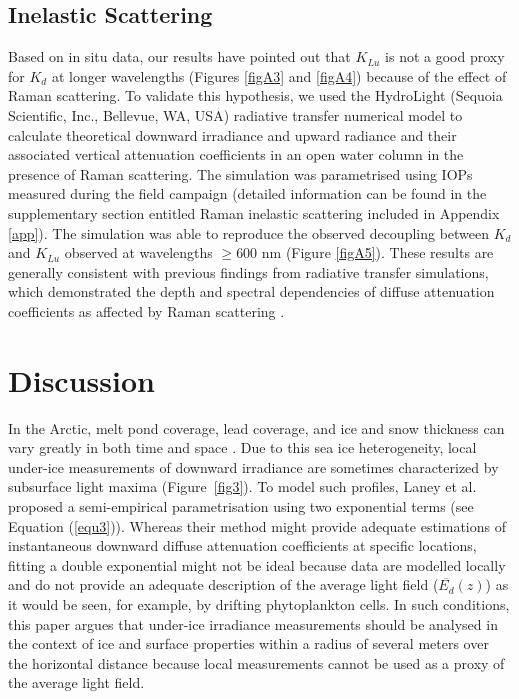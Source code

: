 \documentclass[applsci,article,accept,moreauthors,pdftex,10pt,a4paper]{Definitions/mdpi}
\newcommand{\ked}{\ensuremath{K_{d}}}
\newcommand{\klu}{\ensuremath{K_{Lu}}}
\newcommand{\meanedz}{\ensuremath{{\overline{E_d}(z)}}}
\begin{document}
\subsection{Inelastic Scattering}

Based on in situ data, our results have pointed out that \klu{} is not a good proxy for \ked{} at longer wavelengths (Figures \ref{figA3} and \ref{figA4}) because of the effect of Raman scattering. To validate this hypothesis, we used the HydroLight (Sequoia Scientific, Inc., Bellevue, WA, USA) 
radiative transfer numerical model to calculate theoretical downward irradiance and upward radiance and their associated vertical attenuation coefficients in an open water column in the presence of Raman scattering. The simulation was parametrised using IOPs measured during the field campaign (detailed information can be found in the supplementary section entitled Raman inelastic scattering included in Appendix \ref{app}). The simulation was able to reproduce the observed decoupling between \ked{} and \klu{} observed at wavelengths $\ge$600 nm (Figure  \ref{figA5}). These results are generally consistent with previous findings from radiative transfer simulations, which demonstrated the depth and spectral dependencies of diffuse attenuation coefficients as affected by Raman scattering \citep{Li2016, Berwald1998}.

%
\section{Discussion}

In the Arctic, melt pond coverage, lead coverage, and ice and snow thickness can vary greatly in both time and space \citep{Landy2014,Eicken2004}. Due to this sea ice heterogeneity, local under-ice measurements of downward irradiance are sometimes characterized by subsurface light maxima (Figure~\ref{fig3}). To model such profiles, Laney et al. \cite{Laney2017} proposed a semi-empirical parametrisation using two exponential terms (see Equation (\ref{equ3})). Whereas their method might provide adequate estimations of instantaneous downward diffuse attenuation coefficients at specific locations, fitting a double exponential might not be ideal because data are modelled locally and do not provide an adequate description of the average light field (\meanedz{}) as it would be seen, for example, by drifting phytoplankton cells. In such conditions, this paper argues that under-ice irradiance measurements should be analysed in the context of ice and surface properties within a radius of several meters over the horizontal distance because local measurements cannot be used as a proxy of the average light field.
\end{document}
